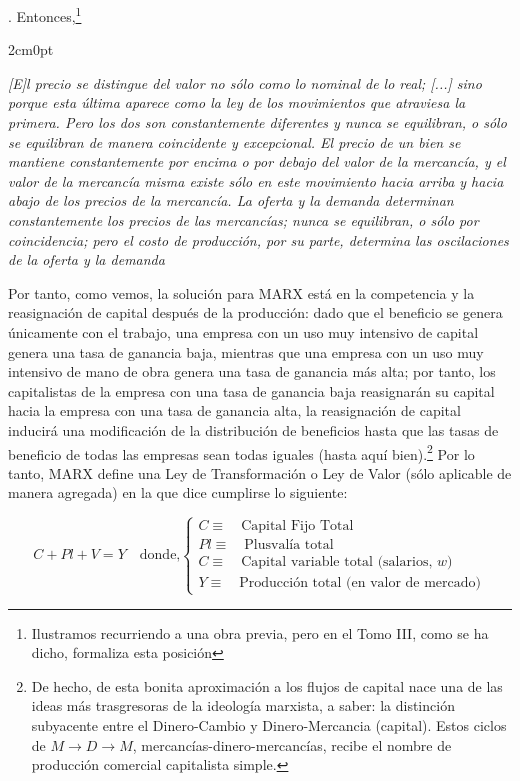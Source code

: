 \documentclass[10pt,a4paper]{article}
\newcommand{\authorfont}[1]{{\fontfamily{EBGaramond-TLF}\selectfont #1}}
\begin{document}
{}. Entonces,\footnote{%
    Ilustramos recurriendo a una obra previa, pero en el Tomo III, como se ha dicho, formaliza esta posición
} 

\begin{adjustwidth}{2cm}{0pt}
\raggedright
\textit{[E]l precio se distingue del valor no sólo como lo nominal de lo real; [...] sino porque esta última aparece como la ley de los movimientos que atraviesa la primera. Pero los dos son constantemente diferentes y nunca se equilibran, o sólo se equilibran de manera coincidente y excepcional. El precio de un bien se mantiene constantemente por encima o por debajo del valor de la mercancía, y el valor de la mercancía misma existe sólo en este movimiento hacia arriba y hacia abajo de los precios de la mercancía. La oferta y la demanda determinan constantemente los precios de las mercancías; nunca se equilibran, o sólo por coincidencia; pero el costo de producción, por su parte, determina las oscilaciones de la oferta y la demanda}\\
\raggedleft{\authorfont{KARL MARX}, “\textit{Cuaderno I – Dinero}”, 1857}
\end{adjustwidth}

Por tanto, como vemos, la solución para MARX está en la competencia y la reasignación de capital después de la producción: dado que el beneficio se genera únicamente con el trabajo, una empresa con un uso muy intensivo de capital genera una tasa de ganancia baja, mientras que una empresa con un uso muy intensivo de mano de obra genera una tasa de ganancia más alta; por tanto, los capitalistas de la empresa con una tasa de ganancia baja reasignarán su capital hacia la empresa con una tasa de ganancia alta, la reasignación de capital inducirá una modificación de la distribución de beneficios hasta que las tasas de beneficio de todas las empresas sean todas iguales (hasta aquí bien).\footnote{%
    De hecho, de esta bonita aproximación a los flujos de capital nace una de las ideas más trasgresoras de la ideología marxista, a saber: la distinción subyacente entre el Dinero-Cambio y Dinero-Mercancia (capital). Estos ciclos de $M\to D\to M$, mercancías-dinero-mercancías, recibe el nombre de producción comercial capitalista simple.
} Por lo tanto, MARX define una Ley de Transformación o Ley de Valor (sólo aplicable de manera agregada) en la que dice cumplirse lo siguiente:

$$C+Pl+V=Y\quad \text{donde,}
\begin{cases}
    C\equiv\quad \text{Capital Fijo Total}\\[0.5em]
    Pl\equiv\quad \text{Plusvalía total}\\[0.5em]
    C\equiv\quad \text{Capital variable total (salarios, }w)\\[0.5em]
    Y\equiv\quad \text{Producción total (en valor de mercado)}
\end{cases}$$
\end{document}
